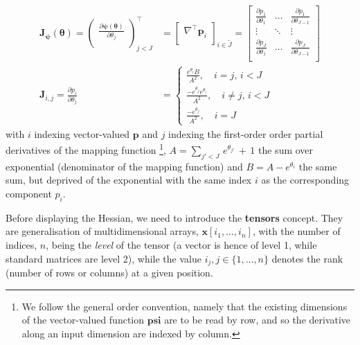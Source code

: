 \documentclass[long, final]{jobim}
\begin{document}
\begin{equation}
\label{eq:mapping-function-gradient}
\begin{aligned}
    \mathbf{J}_{\boldsymbol{\psi}} (\boldsymbol{\theta}) = 
\begin{pmatrix}
\frac{\partial \boldsymbol{\psi}(\boldsymbol{\theta})}{\partial \theta_j} \\
\end{pmatrix}_{j < J }^\top &=
\begin{bmatrix}
\nabla^\top \boldsymbol{p}_i \\
\end{bmatrix}_{i \in \widetilde{J} } = \begin{bmatrix}
\frac{\partial p_1}{\partial \theta_1} & \ldots & \frac{\partial p_1}{\partial \theta_{J-1}}\\
\vdots & \ddots & \vdots \\
\frac{\partial p_J}{\partial \theta_1} & \ldots & \frac{\partial p_J}{\partial \theta_{J-1}}\\
\end{bmatrix}\\  
\mathbf{J}_{i,j} =
   \frac{\partial p_i}{\partial \theta_{j}} &=
\begin{cases}
\frac{e^{\theta_i}B}{A^2 },\quad i = j, \, i < J\\
\frac{-e^{\theta_j}e^{\theta_i}}{A^2 }, \quad i \neq j, \, i < J\\
\frac{-e^{\theta_j}}{A^2}, \quad i=J
\end{cases}
  \end{aligned}
\end{equation}
with $i$ indexing vector-valued $\boldsymbol{p}$ and $j$ indexing the first-order order partial derivatives of the mapping function \footnote{We follow the general order convention, namely that the existing dimensions of the vector-valued function $\boldsymbol{psi}$ are to be read by row, and so the derivative along an input dimension are indexed by column.}, $A=\sum_{j' < J} \,e^{\theta_{j'}} \, +  \, 1$ the sum over exponential (denominator of the mapping function) and $B=A - e^{\theta_{i}}$ the same sum, but deprived of the exponential with the same index $i$ as the corresponding component $p_i$.

Before displaying the Hessian, we need to introduce the \textbf{tensors} concept. They are generalisation of multidimensional arrays, $\boldsymbol{x}[i_1, \ldots, i_n]$,  with the number of indices, $n$, being the \textit{level} of the tensor (a vector is hence of level 1, while standard matrices are level 2), while the value $i_j, j \in \{1, \ldots, n\}$ denotes the rank (number of rows or columns) at a given position. 
\end{document}
